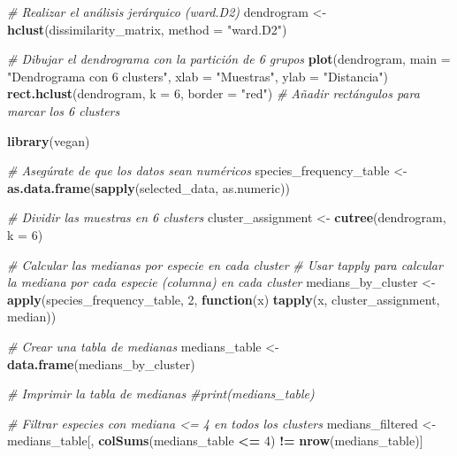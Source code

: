 \documentclass[
]{article}
\newenvironment{Shaded}{\begin{snugshade}}{\end{snugshade}}
\newcommand{\AttributeTok}[1]{\textcolor[rgb]{0.13,0.29,0.53}{#1}}
\newcommand{\CommentTok}[1]{\textcolor[rgb]{0.56,0.35,0.01}{\textit{#1}}}
\newcommand{\ControlFlowTok}[1]{\textcolor[rgb]{0.13,0.29,0.53}{\textbf{#1}}}
\newcommand{\DecValTok}[1]{\textcolor[rgb]{0.00,0.00,0.81}{#1}}
\newcommand{\FunctionTok}[1]{\textcolor[rgb]{0.13,0.29,0.53}{\textbf{#1}}}
\newcommand{\NormalTok}[1]{#1}
\newcommand{\OtherTok}[1]{\textcolor[rgb]{0.56,0.35,0.01}{#1}}
\newcommand{\SpecialCharTok}[1]{\textcolor[rgb]{0.81,0.36,0.00}{\textbf{#1}}}
\newcommand{\StringTok}[1]{\textcolor[rgb]{0.31,0.60,0.02}{#1}}
\begin{document}
\begin{Shaded}
\begin{Highlighting}[]
\CommentTok{\# Realizar el análisis jerárquico (ward.D2)}
\NormalTok{dendrogram }\OtherTok{\textless{}{-}} \FunctionTok{hclust}\NormalTok{(dissimilarity\_matrix, }\AttributeTok{method =} \StringTok{"ward.D2"}\NormalTok{)}

\CommentTok{\# Dibujar el dendrograma con la partición de 6 grupos}
\FunctionTok{plot}\NormalTok{(dendrogram, }\AttributeTok{main =} \StringTok{"Dendrograma con 6 clusters"}\NormalTok{, }\AttributeTok{xlab =} \StringTok{"Muestras"}\NormalTok{, }\AttributeTok{ylab =} \StringTok{"Distancia"}\NormalTok{)}
\FunctionTok{rect.hclust}\NormalTok{(dendrogram, }\AttributeTok{k =} \DecValTok{6}\NormalTok{, }\AttributeTok{border =} \StringTok{"red"}\NormalTok{)  }\CommentTok{\# Añadir rectángulos para marcar los 6 clusters}

\FunctionTok{library}\NormalTok{(vegan)}

\CommentTok{\# Asegúrate de que los datos sean numéricos}
\NormalTok{species\_frequency\_table }\OtherTok{\textless{}{-}} \FunctionTok{as.data.frame}\NormalTok{(}\FunctionTok{sapply}\NormalTok{(selected\_data, as.numeric))}

\CommentTok{\# Dividir las muestras en 6 clusters}
\NormalTok{cluster\_assignment }\OtherTok{\textless{}{-}} \FunctionTok{cutree}\NormalTok{(dendrogram, }\AttributeTok{k =} \DecValTok{6}\NormalTok{)}

\CommentTok{\# Calcular las medianas por especie en cada cluster}
\CommentTok{\# Usar tapply para calcular la mediana por cada especie (columna) en cada cluster}
\NormalTok{medians\_by\_cluster }\OtherTok{\textless{}{-}} \FunctionTok{apply}\NormalTok{(species\_frequency\_table, }\DecValTok{2}\NormalTok{, }\ControlFlowTok{function}\NormalTok{(x) }\FunctionTok{tapply}\NormalTok{(x, cluster\_assignment, median))}

\CommentTok{\# Crear una tabla de medianas}
\NormalTok{medians\_table }\OtherTok{\textless{}{-}} \FunctionTok{data.frame}\NormalTok{(medians\_by\_cluster)}

\CommentTok{\# Imprimir la tabla de medianas}
\CommentTok{\#print(medians\_table)}


\CommentTok{\# Filtrar especies con mediana \textless{}= 4 en todos los clusters}
\NormalTok{medians\_filtered }\OtherTok{\textless{}{-}}\NormalTok{ medians\_table[, }\FunctionTok{colSums}\NormalTok{(medians\_table }\SpecialCharTok{\textless{}=} \DecValTok{4}\NormalTok{) }\SpecialCharTok{!=} \FunctionTok{nrow}\NormalTok{(medians\_table)]}


\end{Highlighting}
\end{Shaded}
\end{document}
